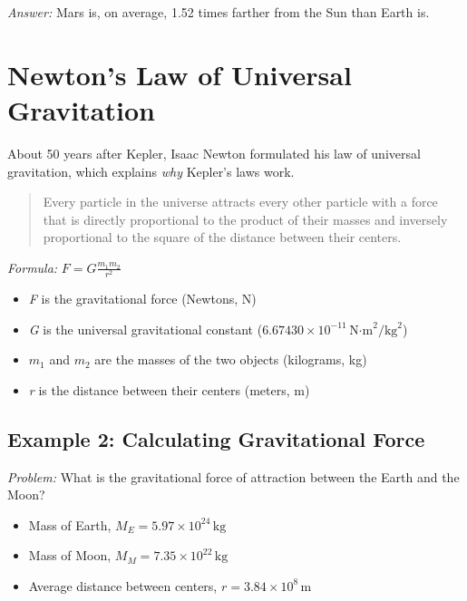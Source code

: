 \documentclass[a4paper,10pt]{article}
\begin{document}
\emph{Answer:} Mars is, on average, 1.52 times farther from the Sun than Earth is.\\

\section{Newton's Law of Universal Gravitation}

About 50 years after Kepler, Isaac Newton formulated his law of universal gravitation, which explains \emph{why} Kepler's laws work.

\begin{quote}
Every particle in the universe attracts every other particle with a force that is directly proportional to the product of their masses and inversely proportional to the square of the distance between their centers.                                                                                                                                                                                                                      \end{quote}
\emph{Formula:} \( F = G \frac{m_1 m_2}{r^2} \)\\
\begin{itemize}
\item   \emph{F} is the gravitational force (Newtons, N)
\item   \emph{G} is the universal gravitational constant (\( 6.67430 \times 10^{-11} \, \text{N·m}^2/\text{kg}^2 \))
\item   \emph{\(m_1\)} and \(m_2\) are the masses of the two objects (kilograms, kg)
\item   \emph{r} is the distance between their centers (meters, m)
\end{itemize}

\subsection{Example 2: Calculating Gravitational Force}

\emph{Problem:} What is the gravitational force of attraction between the Earth and the Moon?\\
\begin{itemize}
\item   Mass of Earth, \( M_E = 5.97 \times 10^{24} \, \text{kg} \)
\item   Mass of Moon, \( M_M = 7.35 \times 10^{22} \, \text{kg} \)
\item   Average distance between centers, \( r = 3.84 \times 10^8 \, \text{m} \)
\end{itemize}
\end{document}
